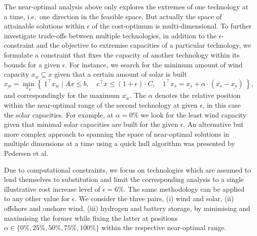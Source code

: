The near-optimal analysis above only explores the extremes of one technology at
a time, i.e.~one direction in the feasible space. But actually the space of
attainable solutions within $\epsilon$ of the cost-optimum is multi-dimensional.
To further investigate trade-offs between multiple technologies, in addition to
the $\epsilon$-constraint and the objective to extremise capacities of a
particular technology, we formulate a constraint that fixes the capacity of
another technology within its bounds for a given $\epsilon$. For instance, we
search for the minimum amount of wind capacity $x_w \subseteq x$ given that a
certain amount of solar is built
\begin{equation}
    \label{eq:2D}
    \underline{x_w} = \min_{x_w}\left\{\:1^\top x_w \mid Ax\leq b,\quad c^\top x\leq (1+\epsilon)\cdot C, \quad 1^\top x_s = \underline{x_s} + \alpha \cdot (\overline{x_s}-\underline{x_s}) \:\right\},
\end{equation}
and correspondingly for the maximum $\overline{x_w}$. The $\alpha$ denotes the
relative position within the near-optimal range of the second technology at
given $\epsilon$, in this case the solar capacities. For example, at
$\alpha=0\%$ we look for the least wind capacity given that minimal solar
capacities are built for the given $\epsilon$. An alternative but more complex
approach to spanning the space of near-optimal solutions in multiple dimensions
at a time using a quick hull algorithm was presented by Pedersen et
al.~\cite{pedersen_modeling_2020}

Due to computational constraints, we focus on technologies which are assumed to
lend themselves to substitution and limit the corresponding analysis to a single
illustrative cost increase level of $\epsilon=6\%$. The same methodology can be
applied to any other value for $\epsilon$. We consider the three pairs, (i) wind
and solar, (ii) offshore and onshore wind, (iii) hydrogen and battery storage,
by minimising and maximising the former while fixing the latter at positions
$\alpha \in \{0\%,25\%,50\%,75\%,100\%\}$ within the respective near-optimal
range.



